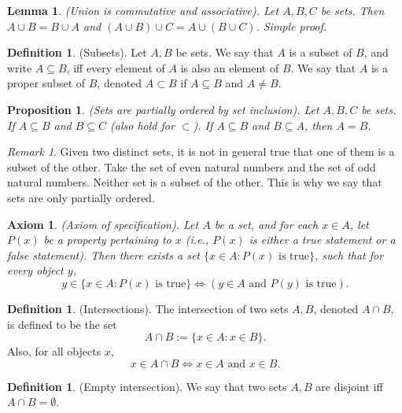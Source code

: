 \documentclass[12pt]{article}
\newtheorem{lemma}[theorem]{Lemma}
\newtheorem{proposition}[theorem]{Proposition}
\newtheorem{axiom}[theorem]{Axiom}
\theoremstyle{definition}
\newtheorem{definition}[theorem]{Definition}
\theoremstyle{remark}
\newtheorem*{remark}{Remark}
\begin{document}
\begin{lemma}
    (Union is commutative and associative). Let $A, B, C$ be sets. Then $A \cup B = B \cup A$ and $(A \cup B) \cup C = A \cup (B \cup C)$. Simple proof.
\end{lemma}

\begin{definition}
    (Subsets). Let $A, B$ be sets. We say that $A$ is a subset of $B$, and write $A \subseteq B$, iff every element of $A$ is also an element of $B$. We say that $A$ is a proper subset of $B$, denoted $A \subset B$ if $A \subseteq B$ and $A \neq B$. 
\end{definition}

\begin{proposition}
    (Sets are partially ordered by set inclusion). Let $A, B, C$ be sets. If $A \subseteq B$ and $B \subseteq C$ (also hold for $\subset$). If $A \subseteq B$ and $B \subseteq A$, then $A=B$.
\end{proposition}

\begin{remark}
    Given two distinct sets, it is not in general true that one of them is a subset of the other. Take the set of even natural numbers and the set of odd natural numbers. Neither set is a subset of the other. This is why we say that sets are only partially ordered.
\end{remark}

\begin{axiom}
    (Axiom of specification). Let $A$ be a set, and for each $x \in A$, let $P(x)$ be a property pertaining to $x$ (i.e., $P(x)$ is either a true statement or a false statement). Then there exists a set $\{x \in A \colon P(x) \text{ is true}\}$, such that for every object $y$, \[
        y \in \{x \in A \colon P(x) \text{ is true}\} \iff (y \in A \text{ and } P(y) \text{ is true})
    .\]
\end{axiom}

\begin{definition}
    (Intersections). The intersection of two sets $A, B$, denoted $A \cap B$, is defined to be the set \[
        A \cap B := \{x \in A \colon x \in B\}
    .\]
    Also, for all objects $x$, \[
        x \in A \cap B \iff x \in A \text{ and } x \in B 
    .\]
\end{definition}

\begin{definition}
    (Empty intersection). We say that two sets $A, B$ are disjoint iff $A \cap B = \emptyset$.
\end{definition}
    
\end{document}
